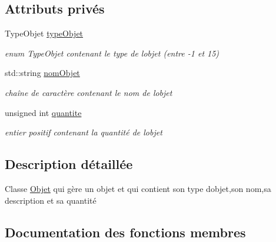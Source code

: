 \subsection*{Attributs privés}
\begin{DoxyCompactItemize}
\item 
\mbox{\label{class_objet_a7561dbf89b5c4e9262198c502c070642}} 
Type\+Objet \hyperlink{class_objet_a7561dbf89b5c4e9262198c502c070642}{type\+Objet}
\begin{DoxyCompactList}\small\item\em enum Type\+Objet contenant le type de l\textquotesingle{}objet (entre -\/1 et 15) \end{DoxyCompactList}\item 
\mbox{\label{class_objet_a958a8478200ad06343102d7709643e5c}} 
std\+::string \hyperlink{class_objet_a958a8478200ad06343102d7709643e5c}{nom\+Objet}
\begin{DoxyCompactList}\small\item\em chaîne de caractère contenant le nom de l\textquotesingle{}objet \end{DoxyCompactList}\item 
\mbox{\label{class_objet_a8ab48702d757dbea52a03aa0d4de9de9}} 
unsigned int \hyperlink{class_objet_a8ab48702d757dbea52a03aa0d4de9de9}{quantite}
\begin{DoxyCompactList}\small\item\em entier positif contenant la quantité de l\textquotesingle{}objet \end{DoxyCompactList}\end{DoxyCompactItemize}


\subsection{Description détaillée}
Classe \hyperlink{class_objet}{Objet} qui gère un objet et qui contient son type d\textquotesingle{}objet,son nom,sa description et sa quantité 

\subsection{Documentation des fonctions membres}
\mbox{\label{class_objet_a29be0a2d83cdebac4fedd495e3824515}} 
